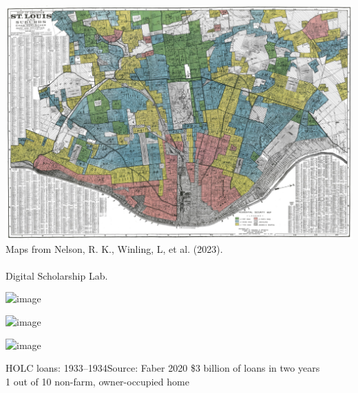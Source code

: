\documentclass{beamer}
\newcommand\bref[2]{\href{#1}{\color{blue}{#2}}}
\begin{document}
\begin{frame}
\includegraphics<1>[width = \textwidth]{figures/holc-scan-stlouis} \\
\footnotesize
Maps from Nelson, R. K., Winling, L, et al. (2023).\\\bref{https://dsl.richmond.edu/panorama/redlining}{Mapping Inequality: Redlining in New Deal America.}\\Digital Scholarship Lab.

\end{frame}

\begin{frame}
\end{frame}

\begin{frame}
\includegraphics<1>[height = \textheight]{figures/holc-scan-buffalo}
\end{frame}

\begin{frame}
\includegraphics<1>[height = \textheight]{figures/holc-scan-chicago}
\end{frame}

\begin{frame}
\includegraphics<1>[width = \textwidth]{figures/holc-scan-la}
\end{frame}

\begin{frame}{HOLC loans: 1933--1934}{Source: Faber 2020}
\$3 billion of loans in two years\\
1 out of 10 non-farm, owner-occupied home
\end{frame}
\end{document}

